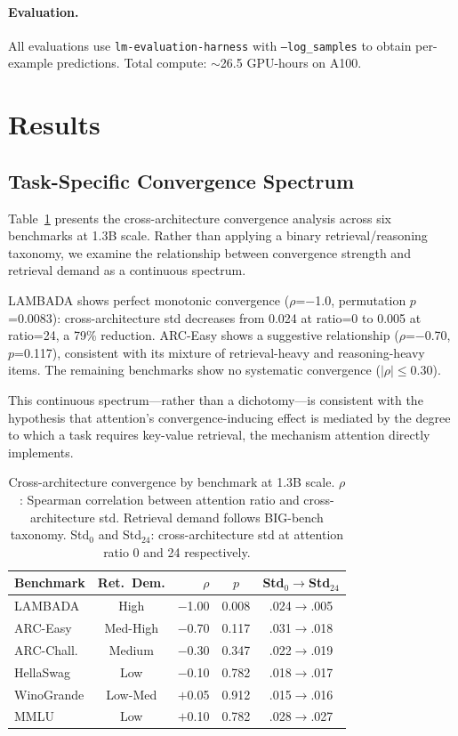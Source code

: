 \documentclass[11pt,twocolumn,a4paper]{article}
\begin{document}
\paragraph{Evaluation.} All evaluations use \texttt{lm-evaluation-harness} \cite{gao2024framework} with \texttt{--log\_samples} to obtain per-example predictions. Total compute: $\sim$26.5 GPU-hours on A100.

\section{Results}

\subsection{Task-Specific Convergence Spectrum}
\label{sec:task-specificity}

Table~\ref{tab:convergence} presents the cross-architecture convergence analysis across six benchmarks at 1.3B scale. Rather than applying a binary retrieval/reasoning taxonomy, we examine the relationship between convergence strength and retrieval demand as a continuous spectrum.

LAMBADA shows perfect monotonic convergence ($\rho$=$-$1.0, permutation $p$=0.0083): cross-architecture std decreases from 0.024 at ratio=0 to 0.005 at ratio=24, a 79\% reduction. ARC-Easy shows a suggestive relationship ($\rho$=$-$0.70, $p$=0.117), consistent with its mixture of retrieval-heavy and reasoning-heavy items. The remaining benchmarks show no systematic convergence ($|\rho| \leq 0.30$).

This continuous spectrum---rather than a dichotomy---is consistent with the hypothesis that attention's convergence-inducing effect is mediated by the degree to which a task requires key-value retrieval, the mechanism attention directly implements.

\begin{table}[t]
\centering
\small
\begin{tabular}{lcrcc}
\toprule
\textbf{Benchmark} & \textbf{Ret.\ Dem.} & \textbf{$\rho$} & \textbf{$p$} & \textbf{Std$_0$$\to$Std$_{24}$} \\
\midrule
LAMBADA & High & $-$1.00 & 0.008 & .024$\to$.005 \\
ARC-Easy & Med-High & $-$0.70 & 0.117 & .031$\to$.018 \\
ARC-Chall. & Medium & $-$0.30 & 0.347 & .022$\to$.019 \\
HellaSwag & Low & $-$0.10 & 0.782 & .018$\to$.017 \\
WinoGrande & Low-Med & $+$0.05 & 0.912 & .015$\to$.016 \\
MMLU & Low & $+$0.10 & 0.782 & .028$\to$.027 \\
\bottomrule
\end{tabular}
\caption{Cross-architecture convergence by benchmark at 1.3B scale. $\rho$: Spearman correlation between attention ratio and cross-architecture std. Retrieval demand follows BIG-bench taxonomy. Std$_0$ and Std$_{24}$: cross-architecture std at attention ratio 0 and 24 respectively.}
\label{tab:convergence}
\end{table}
\end{document}
